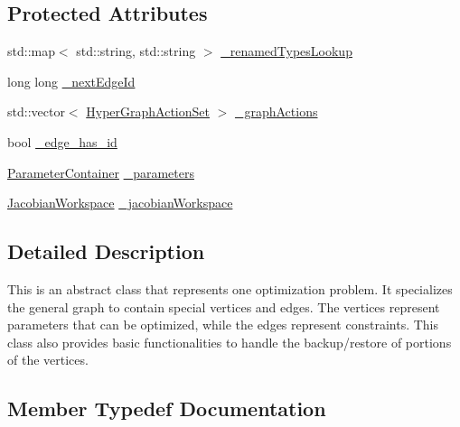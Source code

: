 \subsection*{Protected Attributes}
\begin{DoxyCompactItemize}
\item 
std\+::map$<$ std\+::string, std\+::string $>$ \mbox{\hyperlink{structg2o_1_1_optimizable_graph_a726ab6d0b04b12f835b690d54e061731}{\+\_\+renamed\+Types\+Lookup}}
\item 
long long \mbox{\hyperlink{structg2o_1_1_optimizable_graph_a93a7f05b31bca9ccaa214499f042739a}{\+\_\+next\+Edge\+Id}}
\item 
std\+::vector$<$ \mbox{\hyperlink{structg2o_1_1_optimizable_graph_aa3562ad6794c36ea832095131cfffaac}{Hyper\+Graph\+Action\+Set}} $>$ \mbox{\hyperlink{structg2o_1_1_optimizable_graph_a5e6a371ad7709692e52886ecf3e7250c}{\+\_\+graph\+Actions}}
\item 
bool \mbox{\hyperlink{structg2o_1_1_optimizable_graph_a260451b25094e5e929cc2841e31242f4}{\+\_\+edge\+\_\+has\+\_\+id}}
\item 
\mbox{\hyperlink{classg2o_1_1_parameter_container}{Parameter\+Container}} \mbox{\hyperlink{structg2o_1_1_optimizable_graph_a3a7974befcd934f28a36de3999423d21}{\+\_\+parameters}}
\item 
\mbox{\hyperlink{classg2o_1_1_jacobian_workspace}{Jacobian\+Workspace}} \mbox{\hyperlink{structg2o_1_1_optimizable_graph_a161c01a29d09cca22e223ab2048eaba8}{\+\_\+jacobian\+Workspace}}
\end{DoxyCompactItemize}


\subsection{Detailed Description}
This is an abstract class that represents one optimization problem. It specializes the general graph to contain special vertices and edges. The vertices represent parameters that can be optimized, while the edges represent constraints. This class also provides basic functionalities to handle the backup/restore of portions of the vertices. 

\subsection{Member Typedef Documentation}
\mbox{\label{structg2o_1_1_optimizable_graph_a2b43e807ae6d61ef8749ca1ef7c25f62}} 

